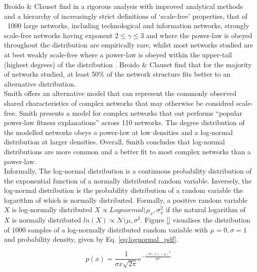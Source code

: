 \documentclass[
	a4paper, %
	10pt, %
	unnumberedsections, %
	twoside, %
]{LTJournalArticle}
\begin{document}
Broido \& Clauset find in a rigorous analysis with improved analytical methods and a hierarchy of increasingly strict definitions of `scale-free' properties, that of ~1000 large networks, including technological and information networks, strongly scale-free networks having exponent \(2 \leq \gamma \leq 3 \) and where the power-law is obeyed throughout the distribution are empirically rare, whilst most networks studied are at best weakly scale-free where a power-law is obeyed within the upper-tail (highest degrees) of the distribution \cite{broido:19}. Broido \& Clauset find that for the majority of networks studied, at least 50\% of the network structure fits better to an alternative distribution. \\

Smith \cite{smith:21} offers an alternative model that can represent the commonly observed shared characteristics of complex networks that may otherwise be considred scale-free. Smith presents a model for complex networks that out performs ``popular power-law fitness explanations'' across 110 networks. The degree distribution of the modelled networks obeys a power-law at low densities and a log-normal distribution at larger densities. Overall, Smith concludes that log-normal distributions are more common and a better fit to most complex networks than a power-law. \\

Informally, The log-normal distribution is a continuous probability distribution of the exponential function of a normally distributed random variable. Inversely, the log-normal distribution is the probability distribution of a random variable the logarithm of which is normally distributed. Formally, a positive random variable \(X\) is log-normally distributed \(X \propto Lognormal(\mu_{x}, \sigma_{x}^{2}\) if the natural logarithm of \(X\) is normally distributed \(ln(X) \propto \mathcal{N}(\mu, \sigma^{2}\). Figure \ref{} visualises the distribution of \( 1000 \) samples of a log-normally distributed random variable  with \( \mu = 0, \sigma = 1 \) and probability density, given by Eq. \ref{eq:lognormal_pdf}. 

\begin{equation}
	p(x) = \frac{1}{\sigma{x}\sqrt{2\pi}}e^{-\frac{(ln(x) - \mu)^{2}}{2\sigma^{2}}}
	\label{eq:lognormal_pdf}
\end{equation}
\end{document}
